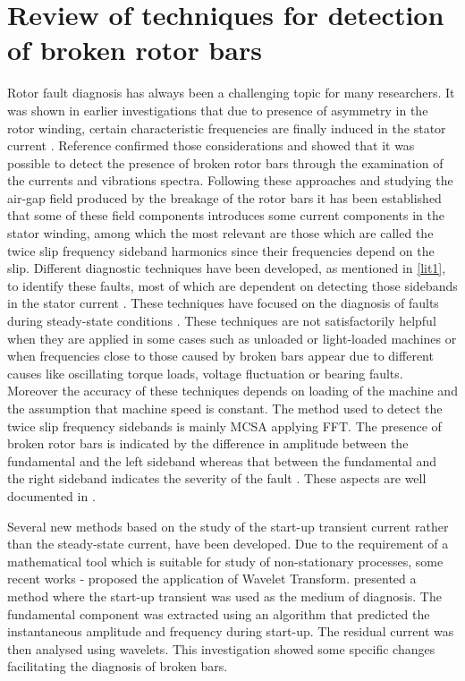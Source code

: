 \documentclass[a4paper,11pt]{report}
\begin{document}
\section{Review of techniques for detection of broken rotor bars}
Rotor fault diagnosis has always been a challenging topic for many researchers. It was shown in earlier investigations that due to presence of asymmetry in the rotor winding, certain characteristic frequencies are finally induced in the stator current \cite{stavrou}. Reference \cite{hargis} confirmed those considerations and showed that it was possible to detect the presence of broken rotor bars through the examination of the currents and vibrations spectra. Following these approaches and studying the air-gap field produced by the breakage of the rotor bars it has been established that some of these field components introduces some current components in the stator winding, among which the most relevant are those which are called the twice slip frequency sideband harmonics since their frequencies depend on the slip. Different diagnostic techniques have been developed, as mentioned in \ref{lit1}, to identify these faults, most of which are dependent on detecting those sidebands in the stator current \cite{hargis}. These techniques have focused on the diagnosis of faults during steady-state conditions \cite{kliman}. These techniques are not satisfactorily helpful when they are applied in some cases such as unloaded or light-loaded machines or when frequencies close to those caused by broken bars appear due to different causes like oscillating torque loads, voltage fluctuation or bearing faults. Moreover the accuracy of these techniques depends on loading of the machine and the assumption that machine speed is constant. The method used to detect the twice slip frequency sidebands is mainly MCSA applying FFT. The presence of broken rotor bars is indicated by the difference in amplitude between the fundamental and the left sideband whereas that between the fundamental and the right sideband indicates the severity of the fault \cite{hargis}. These aspects are well documented in \cite{00873206}.

Several new methods based on the study of the start-up transient current rather than the steady-state current, have been developed. Due to the requirement of a mathematical tool which is suitable for study of non-stationary processes, some recent works \cite{zhang}-\cite{antonino} proposed the application of Wavelet Transform. 
\cite{01210345} presented a method where the start-up transient was used as the medium of diagnosis. The fundamental component was extracted using an algorithm that predicted the instantaneous amplitude and frequency during start-up. The residual current was then analysed using wavelets. This investigation showed some specific changes facilitating the diagnosis of broken bars. 
\end{document}
